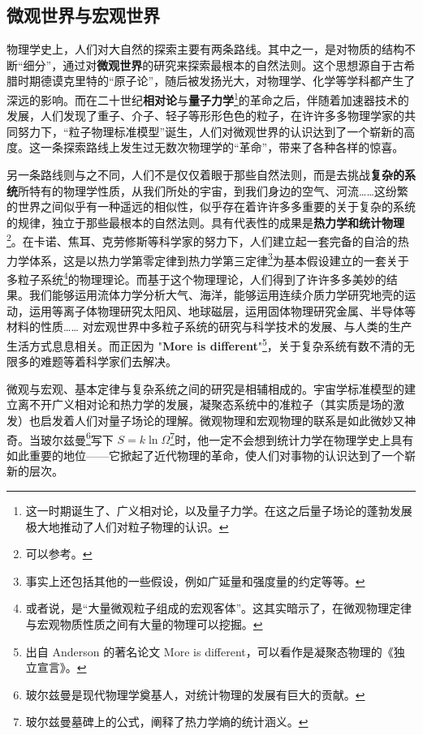 \subsection{微观世界与宏观世界}
物理学史上，人们对大自然的探索主要有两条路线。其中之一，是对物质的结构不断“细分”，通过对\textbf{微观世界}的研究来探索最根本的自然法则。这个思想源自于古希腊时期德谟克里特的“原子论”，随后被发扬光大，对物理学、化学等学科都产生了深远的影响。而在二十世纪\textbf{相对论}与\textbf{量子力学}\footnote{这一时期诞生了、广义相对论，以及量子力学。在这之后量子场论的蓬勃发展极大地推动了人们对粒子物理的认识。}的革命之后，伴随着加速器技术的发展，人们发现了重子、介子、轻子等形形色色的粒子，在许许多多物理学家的共同努力下，“粒子物理标准模型”诞生，人们对微观世界的认识达到了一个崭新的高度。这一条探索路线上发生过无数次物理学的“革命”，带来了各种各样的惊喜。

另一条路线则与之不同，人们不是仅仅着眼于那些自然法则，而是去挑战\textbf{复杂的系统}所特有的物理学性质，从我们所处的宇宙，到我们身边的空气、河流……这纷繁的世界之间似乎有一种遥远的相似性，似乎存在着许许多多重要的关于复杂的系统的规律，独立于那些最根本的自然法则。具有代表性的成果是\textbf{热力学和统计物理}\footnote{可以参考。}。在卡诺、焦耳、克劳修斯等科学家的努力下，人们建立起一套完备的自洽的热力学体系，这是以热力学第零定律到热力学第三定律\footnote{事实上还包括其他的一些假设，例如广延量和强度量的约定等等。}为基本假设建立的一套关于多粒子系统\footnote{或者说，是“大量微观粒子组成的宏观客体”。这其实暗示了，在微观物理定律与宏观物质性质之间有大量的物理可以挖掘。}的物理理论。而基于这个物理理论，人们得到了许许多多美妙的结果。我们能够运用流体力学分析大气、海洋，能够运用连续介质力学研究地壳的运动，运用等离子体物理研究太阳风、地球磁层，运用固体物理研究金属、半导体等材料的性质…… 对宏观世界中多粒子系统的研究与科学技术的发展、与人类的生产生活方式息息相关。而正因为 "\textbf{More is different}"\footnote{出自 Anderson 的著名论文 More is different，可以看作是凝聚态物理的《独立宣言》。}，关于复杂系统有数不清的无限多的难题等着科学家们去解决。

微观与宏观、基本定律与复杂系统之间的研究是相辅相成的。宇宙学标准模型的建立离不开广义相对论和热力学的发展，凝聚态系统中的准粒子（其实质是场的激发）也启发着人们对量子场论的理解。微观物理和宏观物理的联系是如此微妙又神奇。当玻尔兹曼\footnote{玻尔兹曼是现代物理学奠基人，对统计物理的发展有巨大的贡献。}写下 $S=k\ln \Omega$\footnote{玻尔兹曼墓碑上的公式，阐释了热力学熵的统计涵义。}时，他一定不会想到统计力学在物理学史上具有如此重要的地位——它掀起了近代物理的革命，使人们对事物的认识达到了一个崭新的层次。
